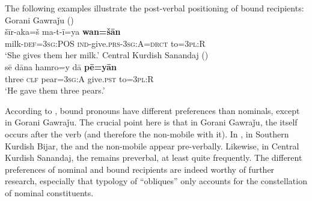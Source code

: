 \documentclass[output=paper,colorlinks,citecolor=brown]{langscibook}
\begin{document}
\begin{sloppypar}
The following examples illustrate the post-verbal positioning of bound recipients:
\ea
\ea\label{MGKC:ex:17a}
Gorani Gawraǰu (\citealt[B, 0233]{mohammadirad_gorani_2022}) \\
\gll šīr-aka=š ma-t-ī=ya \textbf{wan=šān} \\
milk-\textsc{def=3sg:POS} \textsc{ind-}give.\textsc{prs-3sg:A=drct} to=\textsc{3pl:R} \\
\glt `She gives them her milk.'
\newpage
\ex\label{MGKC:ex:17b}
Central Kurdish Sanandaj (\citealt[B, 0323]{mohammadirad_Sanandaj_Kurdish_2022}) \\
\gll sē dāna hamro=y dā \textbf{pē=yān} \\
three \textsc{clf} pear=\textsc{3sg:A} give.\textsc{pst} to=\textsc{3pl:R} \\
\glt `He gave them three pears.' \\
\z
\z 


According to , bound pronouns have different  preferences than nominals, except in Gorani Gawraǰu. The crucial point here is that in Gorani Gawraǰu, the  itself occurs after the verb (and therefore the non-mobile  with it). In , in Southern Kurdish Bijar, the  and the non-mobile  appear pre-verbally. Likewise, in Central Kurdish Sanandaj, the  remains preverbal, at least quite frequently. The different  preferences of nominal and bound recipients are indeed worthy of further research, especially that  typology of ``obliques'' only accounts for the  constellation of nominal constituents.


\end{sloppypar}
\end{document}
